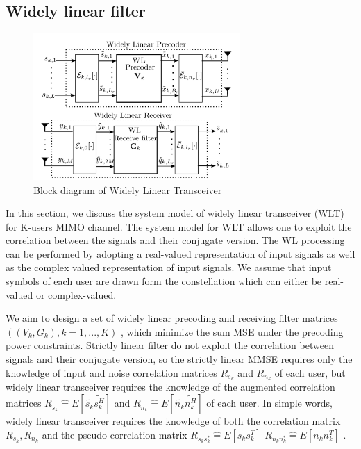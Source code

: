 \documentclass[12pt,a4paper,notitlepage,twoside,headsepline]{scrartcl}
\begin{document}
\subsection{Widely linear filter}

\begin{figure}[!ht]
\begin{center}
\includegraphics[width=0.7\textwidth]{figures/wl_system_model.png}
\end{center}
\caption{Block diagram of Widely Linear Transceiver} 
\label{fig:example}
\end{figure}

In this section, we discuss the system model of widely linear transceiver (WLT) for K-users MIMO channel. The system model for WLT allows one to exploit the correlation between the signals and their conjugate version. The WL processing can be performed by adopting a real-valued representation of input signals as well as the complex valued representation of input signals. We assume that input symbols of each user are drawn form the constellation which can either be real-valued or complex-valued. 

We aim to design a set of widely linear precoding and receiving filter matrices 
$((V_k,G_k), k = 1, ..., K)$
, which minimize the sum MSE under the precoding power constraints. Strictly linear filter do not exploit the correlation between signals and their conjugate version, so the strictly linear MMSE requires only the knowledge of input and noise correlation matrices $R_{s_k}$ and $R_{n_k}$ of each user, but widely linear transceiver requires the knowledge of the augmented correlation matrices
$R_{\tilde{s_k}} \hat{=} E[\tilde{s_k} \tilde{s_k^H}] $ and 
$R_{\tilde{n_k}} \hat{=} E[\tilde{n_k} \tilde{n_k^H}]$ 
of each user. In simple words, widely linear transceiver requires the knowledge of both the correlation matrix 
$R_{s_k}, R_{n_k}$ 
and the pseudo-correlation matrix 
$R_{s_k s_k^*} \hat{=} E[s_k s_k^T]$ $R_{n_k n_k^*} \hat{=} E[n_k n_k^T]$ .
\end{document}

